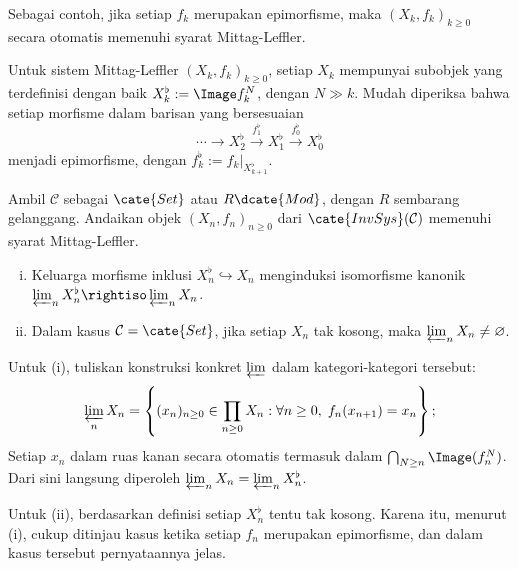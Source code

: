 Sebagai contoh, jika setiap $f_k$ merupakan epimorfisme, maka
$(X_k, f_k)_{k \geq 0}$ secara otomatis memenuhi syarat Mittag-Leffler.

Untuk sistem Mittag-Leffler $(X_k, f_k)_{k \geq 0}$, setiap $X_k$
mempunyai subobjek yang terdefinisi dengan baik
$X_k^\flat := \Image f^N_k$, dengan $N \gg k$. Mudah diperiksa bahwa setiap
morfisme dalam barisan yang bersesuaian
\[ \cdots \to X^\flat_2 \xrightarrow{f^\flat_1} X^\flat_1 \xrightarrow{f^\flat_0} X^\flat_0 \]
menjadi epimorfisme, dengan
$f^\flat_k := f_k|_{X^\flat_{k+1}}$.

\begin{lema}\label{prop:ML-nonempty}
Ambil $\mathcal{C}$ sebagai $\cate{Set}$ atau $R\dcate{Mod}$, dengan $R$
sembarang gelanggang. Andaikan objek
$(X_n, f_n)_{n \geq 0}$ dari $\cate{InvSys}(\mathcal{C})$ memenuhi
syarat Mittag-Leffler.
\begin{enumerate}[(i)]
	\item Keluarga morfisme inklusi $X_n^\flat \hookrightarrow X_n$
  menginduksi isomorfisme kanonik
$\varprojlim_n X^\flat_n \rightiso \varprojlim_n X_n$.
	\item Dalam kasus $\mathcal{C} = \cate{Set}$, jika setiap $X_n$
  tak kosong, maka $\varprojlim_n X_n \neq \emptyset$.
\end{enumerate}
\end{lema}
\begin{bukti}
Untuk (i), tuliskan konstruksi konkret $\varprojlim$ dalam
kategori-kategori tersebut:
\[ \varprojlim_n X_n = \left\{ (x_n)_{n \geq 0} \in \prod_{n \geq 0} X_n : \forall n \geq 0,\; f_n(x_{n+1}) = x_n \right\}; \]
Setiap $x_n$ dalam ruas kanan secara otomatis termasuk dalam
$\bigcap_{N \geq n} \Image(f^N_n)$. Dari sini langsung diperoleh
$\varprojlim_n X_n = \varprojlim_n X^\flat_n$.

Untuk (ii), berdasarkan definisi setiap $X_n^\flat$ tentu tak kosong.
Karena itu, menurut (i), cukup ditinjau kasus ketika setiap
$f_n$ merupakan epimorfisme, dan dalam kasus tersebut pernyataannya
jelas.
\end{bukti}

